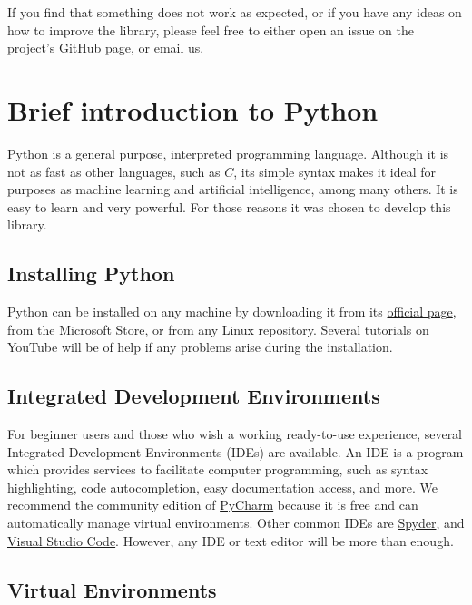 \documentclass[a4paper,12pt]{article}
\begin{document}
If you find that something does not work as expected, or if you have any ideas on how to improve the library, please feel free to either open an issue on the project's \href{https://github.com/JuodaanViinaa/Laboratorio}{GitHub} page, or \href{mailto:maldonadodaniel96@outlook.com}{email us}.

\newpage
\section{Brief introduction to Python}

Python is a general purpose, interpreted programming language. Although it is not as fast as other languages, such as $C$, its simple syntax makes it ideal for purposes as machine learning and artificial intelligence, among many others. It is easy to learn and very powerful. For those reasons it was chosen to develop this library.

\subsection{Installing Python}

Python can be installed on any machine by downloading it from its \href{https://www.python.org/}{official page}, from the Microsoft Store, or from any Linux repository. Several tutorials on YouTube will be of help if any problems arise during the installation.

\subsection{Integrated Development Environments}

For beginner users and those who wish a working ready-to-use experience, several Integrated Development Environments (IDEs) are available. An IDE is a program which provides services to facilitate computer programming, such as syntax highlighting, code autocompletion, easy documentation access, and more. We recommend the community edition of \href{https://www.jetbrains.com/pycharm/download/}{PyCharm} because it is free and can automatically manage virtual environments. Other common IDEs are \href{https://www.spyder-ide.org/}{Spyder}, and \href{https://code.visualstudio.com/}{Visual Studio Code}. However, any IDE or text editor will be more than enough.

\subsection{Virtual Environments}
\end{document}
